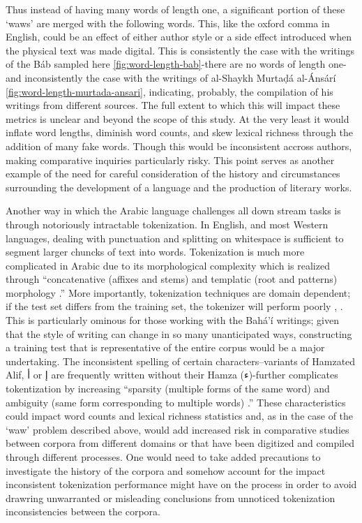 \documentclass[12pt, oneside]{report}
\begin{document}
Thus instead of having many words of length one, a significant portion of these `waws' are merged with the following words.
This, like the oxford comma in English, could be an effect of either author style or a side effect introduced when the physical text was made digital.
This is consistently the case with the writings of the B\'{a}b sampled here \autoref{fig:word-length-bab}-there are no words of length one-and inconsistently the case with the writings of al-Shaykh Murtaḍ\'{a} al-\'{A}ns\'{a}r\'{i} \autoref{fig:word-length-murtada-ansari}, indicating, probably, the compilation of his writings from different sources.
The full extent to which this will impact these metrics is unclear and beyond the scope of this study.
At the very least it would inflate word lengths, diminish word counts, and skew lexical richness through the addition of many fake words.
Though this would be inconsistent accross authors, making comparative inquiries particularly risky.
This point serves as another example of the need for careful consideration of the history and circumstances surrounding the development of a language and the production of literary works.
\par
Another way in which the Arabic language challenges all down stream tasks is through notoriously intractable tokenization. In English, and most Western languages, dealing with punctuation and splitting on whitespace is sufficient to segment larger chuncks of text into words. Tokenization is much more complicated in Arabic due to its morphological complexity which is realized through ``concatenative (affixes and stems) and templatic (root and patterns) morphology \cite{}.'' More importantly, tokenization techniques are domain dependent; if the test set differs from the training set, the tokenizer will perform poorly \cite{}, \cite{}. This is particularly ominous for those working with the Bah\'{a}'\'{i} writings; given that the style of writing can change in so many unanticipated ways, constructing a training test that is representative of the entire corpus would be a major undertaking. The inconsistent spelling of certain characters–variants of Hamzated Alif, أ or إ are frequently written without their Hamza (ء)-further complicates tokentization by increasing ``sparsity (multiple forms
of the same word) and ambiguity (same form corresponding to multiple words) \cite{}.'' These characteristics could impact word counts and lexical richness statistics and, as in the case of the `waw' problem described above, would add increased risk in comparative studies between corpora from different domains or that have been digitized and compiled through different processes. One would need to take added precautions to investigate the history of the corpora and somehow account for the impact inconsistent tokenization performance might have on the process in order to avoid drawring unwarranted or misleading conclusions from unnoticed tokenization inconsistencies between the corpora.
\end{document}
